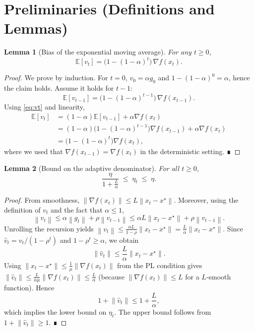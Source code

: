 \documentclass{article}
\newtheorem{lemma}{Lemma}
\newcommand{\E}{\mathbb{E}}
\newcommand{\norm}[1]{\left\|#1\right\|}
\newcommand{\grad}{\nabla}
\begin{document}
\section*{Preliminaries (Definitions and Lemmas)}
\begin{lemma}[Bias of the exponential moving average]\label{lem:bias}
For any $t\ge 0$,
\[
    \E[v_t]=\bigl(1-(1-\alpha)^t\bigr)\,\grad f(x_t).
\]
\end{lemma}
\begin{proof}
We prove by induction. For $t=0$, $v_0=\alpha g_0$ and $1-(1-\alpha)^0= \alpha$, hence the claim holds.
Assume it holds for $t-1$:
\[
    \E[v_{t-1}]=\bigl(1-(1-\alpha)^{t-1}\bigr)\,\grad f(x_{t-1}).
\]
Using \eqref{eq:vt} and linearity,
\[
\begin{aligned}
    \E[v_t] &= (1-\alpha)\E[v_{t-1}]+\alpha \grad f(x_t)\\
            &= (1-\alpha)\bigl(1-(1-\alpha)^{t-1}\bigr)\grad f(x_{t-1})+\alpha\grad f(x_t)\\
            &= \bigl(1-(1-\alpha)^t\bigr)\grad f(x_t),
\end{aligned}
\]
where we used that $\grad f(x_{t-1})=\grad f(x_t)$ in the deterministic setting. ∎
\end{proof}

\begin{lemma}[Bound on the adaptive denominator]\label{lem:denominator}
For all $t\ge 0$,
\[
    \frac{\eta}{1+\frac{L}{\alpha}}\;\le\; \eta_t \;\le\; \eta .
\]
\end{lemma}
\begin{proof}
From smoothness, $\norm{\grad f(x_t)}\le L\norm{x_t-x^{\star}}$. Moreover, using the definition of $v_t$ and the fact that $\alpha\le 1$,
\[
    \norm{v_t}\le \alpha\norm{g_t}+\rho\norm{v_{t-1}}
    \le \alpha L\norm{x_t-x^{\star}}+\rho\norm{v_{t-1}} .
\]
Unrolling the recursion yields $\norm{v_t}\le \frac{\alpha L}{1-\rho}\norm{x_t-x^{\star}} = \frac{L}{\alpha}\norm{x_t-x^{\star}}$.
Since $\hat v_t = v_t/(1-\rho^t)$ and $1-\rho^t\ge \alpha$, we obtain
\[
    \norm{\hat v_t}\le \frac{L}{\alpha}\norm{x_t-x^{\star}}.
\]
Using $\norm{x_t-x^{\star}}\le \frac{1}{\mu}\norm{\grad f(x_t)}$ from the PL condition gives $\norm{\hat v_t}\le \frac{L}{\alpha\mu}\norm{\grad f(x_t)}\le \frac{L}{\alpha}$ (because $\norm{\grad f(x_t)}\le L$ for a $L$‑smooth function). Hence
\[
    1+\norm{\hat v_t}\le 1+\frac{L}{\alpha},
\]
which implies the lower bound on $\eta_t$. The upper bound follows from $1+\norm{\hat v_t}\ge 1$. ∎
\end{proof}
\end{document}
